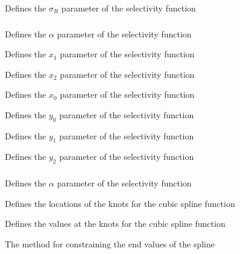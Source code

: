  {Defines the $\sigma_R$ parameter of the selectivity function}

\subsubsection[Double-exponential]{}

 {Defines the $\alpha$ parameter of the selectivity function}

 {Defines the $x_1$ parameter of the selectivity function}

 {Defines the $x_2$ parameter of the selectivity function}

 {Defines the $x_0$ parameter of the selectivity function}

 {Defines the $y_0$ parameter of the selectivity function}

 {Defines the $y_1$ parameter of the selectivity function}

 {Defines the $y_2$ parameter of the selectivity function}

\subsubsection[Spline]{}

 {Defines the $\alpha$ parameter of the selectivity function}

 {Defines the locations of the knots for the cubic spline function}

 {Defines the values at the knots for the cubic spline function}

 {The method for constraining the end values of the spline}

